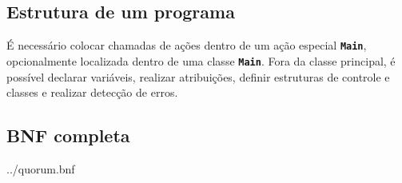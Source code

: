 \documentclass[12pt, a4paper]{article}
\newcommand{\ic}[1]{\textbf{\lstinline{#1}}}
\begin{document}
\subsection{Estrutura de um programa}
É necessário colocar chamadas de ações dentro de um ação especial \ic{Main},
opcionalmente localizada dentro de uma classe \ic{Main}. Fora da classe
principal, é possível declarar variáveis, realizar atribuições, definir
estruturas de controle e classes e realizar detecção de erros.

\subsection{BNF completa}
\begin{lstinputlisting}{../quorum.bnf}
\end{lstinputlisting}
\end{document}
